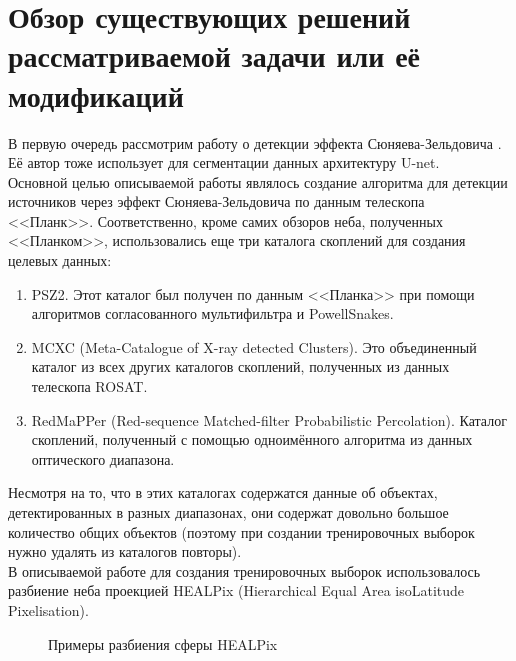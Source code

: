 \chapter{Обзор существующих решений рассматриваемой задачи или её модификаций}
\label{cha:ch_2}

В первую очередь рассмотрим работу о детекции эффекта Сюняева-Зельдовича \cite{Bonjean}. Её автор 
тоже использует для сегментации данных архитектуру U-net. \\

Основной целью описываемой работы являлось создание алгоритма для детекции источников через эффект 
Сюняева-Зельдовича по данным телескопа <<Планк>>. Соответственно, кроме самих обзоров неба, полученных 
<<Планком>>, использовались еще три каталога скоплений для создания целевых данных:

\begin{enumerate}
	\item PSZ2. Этот каталог был получен по данным <<Планка>>  при помощи алгоритмов 
	согласованного мультифильтра и PowellSnakes.
	\item MCXC (Meta-Catalogue of X-ray detected Clusters). Это объединенный каталог из всех 
	других каталогов скоплений, полученных из данных телескопа ROSAT.
	\item RedMaPPer (Red-sequence Matched-filter Probabilistic Percolation). Каталог скоплений, 
	полученный с помощью одноимённого алгоритма из данных оптического диапазона.
\end{enumerate}

Несмотря на то, что в этих каталогах содержатся данные об объектах, детектированных в разных 
диапазонах, они содержат довольно большое количество общих объектов (поэтому при создании 
тренировочных выборок нужно удалять из каталогов повторы). \\

В описываемой работе для создания тренировочных выборок использовалось разбиение неба проекцией 
HEALPix (Hierarchical Equal Area isoLatitude Pixelisation). \\
\begin{figure}[h]
	\caption{Примеры разбиения сферы HEALPix \cite{Healpix}}
\end{figure}


